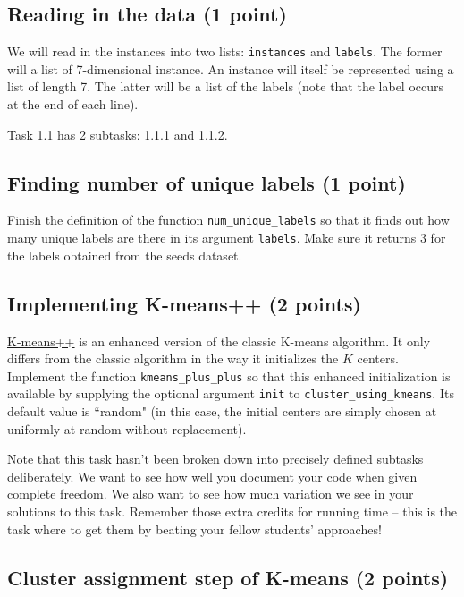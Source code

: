 \documentclass{article}
\begin{document}
\subsection{Reading in the data (1 point)}

We will read in the instances into two lists: {\tt instances} and {\tt labels}. The former will a list of 7-dimensional instance. An instance will itself be represented using a list of length 7.
The latter will be a list of the labels (note that the label occurs at the end of each line).

Task 1.1 has 2 subtasks: 1.1.1 and 1.1.2.

\subsection{Finding number of unique labels (1 point)}

Finish the definition of the function {\tt num\_unique\_labels} so that it finds out how many unique labels are there in its argument {\tt labels}. Make sure it returns 3 for the labels obtained
from the seeds dataset.

\subsection{Implementing K-means++ (2 points)}

\href{http://en.wikipedia.org/wiki/K-means\%2B\%2B}{K-means++} is an enhanced version of the classic K-means algorithm. It only differs from the classic algorithm in the way it initializes the $K$ centers.
Implement the function {\tt kmeans\_plus\_plus} so that this enhanced initialization is available by supplying the optional argument {\tt init} to {\tt cluster\_using\_kmeans}. Its default value is ``random" (in this case,
the initial centers are simply chosen at uniformly at random without replacement).

Note that this task hasn't been broken down into precisely defined subtasks deliberately. We want to see how well you document your code when given complete freedom. We also want to see how much
variation we see in your solutions to this task. Remember those extra credits for running time -- this is the task where to get them by beating your fellow students' approaches!

\subsection{Cluster assignment step of K-means (2 points)}
\end{document}
